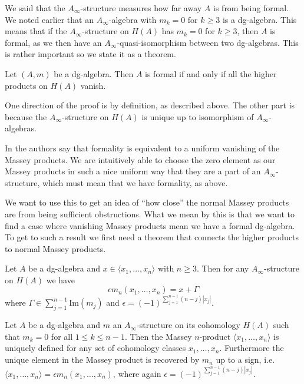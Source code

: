 We said that the $A_\infty$-structure measures how far away $A$ is from being formal. 
We noted earlier that an $A_\infty$-algebra with $m_k=0$ for $k\geq 3$ is a dg-algebra. 
This means that if the $A_\infty$-structure on $H(A)$ has $m_k=0$ for $k\geq 3$, then 
$A$ is formal, as we then have an $A_\infty$-quasi-isomorphism between two dg-algebras. 
This is rather important so we state it as a theorem.

\begin{theorem}
    Let $(A, m)$ be a dg-algebra. Then $A$ is formal if and only if all the higher products
    on $H(A)$ vanish.        
\end{theorem}

One direction of the proof is by definition, as described above. The other part is 
because the $A_\infty$-structure on $H(A)$ is unique up to isomorphism of 
$A_\infty$-algebras.

In \cite{DGMS} the authors say that formality is equivalent to a uniform vanishing of the 
Massey products. We are intuitively able to choose the zero element as our Massey 
products in such a nice uniform way that they are a part of an $A_\infty$-structure, 
which must mean that we have formality, as above.

We want to use this to get an idea of ``how close'' the normal Massey products are 
from being sufficient obstructions. What we mean by this is that we want to find a case 
where vanishing Massey products mean we have a formal dg-algebra. To get to such a result 
we first need a theorem that connects the higher products to normal Massey products.

\begin{theorem}
    Let $A$ be a dg-algebra and $x\in \langle x_1, \ldots, x_n\rangle$ with $n\geq 3$. 
    Then for any $A_\infty$-structure on $H(A)$ we have 
    $$\epsilon m_n(x_1, \ldots, x_n) = x+\Gamma$$ where 
    $\Gamma \in \sum_{j=1}^{n-1}\text{Im}(m_j)$ and 
    $\epsilon = (-1)^{\sum_{j=1}^{n-1} (n-j)|x_j|}$.        
\end{theorem}

\begin{corollary}
    Let $A$ be a dg-algebra and $m$ an $A_\infty$-structure on its cohomology $H(A)$ such 
    that $m_k = 0$ for all $1 \leq k \leq n-1$. Then the Massey $n$-product 
    $\langle x_1, \ldots, x_n \rangle$  is uniquely defined for any set of cohomology 
    classes $x_1, \ldots, x_n$. Furthermore the unique element in the Massey product is 
    recovered by $m_n$ up to a sign, i.e. 
    $\langle x_1, \ldots, x_n \rangle = \epsilon m_n(x_1, \ldots, x_n)$, where again 
    $\epsilon = (-1)^{\sum_{j=1}^{n-1} (n-j)|x_j|}$.
\end{corollary}

